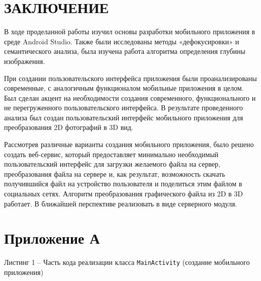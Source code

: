\documentclass[a4paper,12pt]{article}
\begin{document}
\section*{\centering ЗАКЛЮЧЕНИЕ}

В ходе проделанной работы изучил основы разработки мобильного приложения в среде Android Studio. Также были исследованы методы «дефокусировки» и семантического анализа, была изучена работа алгоритма определения глубины изображения.

При создании пользовательского интерфейса приложения были проанализированы современные, с аналогичным функционалом мобильные приложения в целом. Был сделан акцент на необходимости создания современного, функционального и не перегруженного пользовательского интерфейса. В результате проведенного анализа был создан пользовательский интерфейс мобильного приложения для преобразования 2D фотографий в 3D вид.

Рассмотрев различные варианты создания мобильного приложения, было решено создать веб-сервис, который предоставляет минимально необходимый пользовательский интерфейс для загрузки желаемого файла на сервер, преобразования файла на сервере и, как результат, возможность скачать получившийся файл на устройство пользователя и поделиться этим файлом в социальных сетях. Алгоритм преобразования графического файла из 2D в 3D работает. В ближайшей перспективе реализовать в виде серверного модуля. 


\pagebreak

\printbibliography

\pagebreak

\section*{ \centering Приложение А} 

\begin{center}
	Листинг 1 -- Часть кода реализации класса \verb|MainActivity| (создание мобильного приложения)
\end{center}
\end{document}
